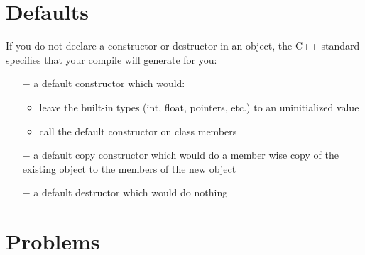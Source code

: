 \documentclass[11pt,fleqn]{book} %
\begin{document}
\section{Defaults}
If you do not declare a constructor or destructor in an object, the C++ standard specifies that your compile will generate for you:
\begin{itemize}
	\item[$-$] a default constructor which would:
	\begin{itemize}
		\item leave the built-in types (int, float, pointers, etc.) to an uninitialized value
		\item call the default constructor on class members
	\end{itemize}
	\item[$-$] a default copy constructor which would do a member wise copy of the existing object to the members of the new object
	\item[$-$] a default destructor which would do nothing
\end{itemize}



\newpage
\section{Problems}
\end{document}
